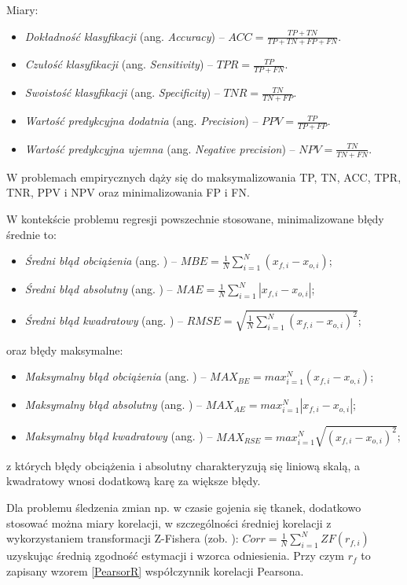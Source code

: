Miary:
\begin{itemize}[noitemsep,nolistsep]
	\item \textit{Dokładność klasyfikacji} (ang. \textit{Accuracy}) -- $ACC = \frac{TP + TN}{TP+TN+FP+FN}$.
	\item \textit{Czułość klasyfikacji} (ang. \textit{Sensitivity}) -- $TPR = \frac{TP}{TP + FN}$.
	\item \textit{Swoistość klasyfikacji} (ang. \textit{Specificity}) -- $TNR = \frac{TN}{TN + FP}$.
	\item \textit{Wartość predykcyjna dodatnia} (ang. \textit{Precision}) -- $PPV = \frac{TP}{TP + FP}$.
	\item \textit{Wartość predykcyjna ujemna} (ang. \textit{Negative precision}) -- $NPV = \frac{TN}{TN + FN}$.
\end{itemize}

W problemach empirycznych dąży się do maksymalizowania TP, TN, ACC, TPR, TNR, PPV i NPV oraz minimalizowania FP i FN. 

W kontekście problemu regresji powszechnie stosowane, minimalizowane błędy średnie to:

\begin{itemize}[noitemsep,nolistsep]
\item \textit{Średni błąd obciążenia} (ang. ) -- $MBE=\frac1N\sum_{i=1}^N{(x_{f,i}-x_{o,i})}$;
\item \textit{Średni błąd absolutny} (ang. ) --  $MAE=\frac1N\sum_{i=1}^N\left|x_{f,i}-x_{o,i}\right|$;
\item \textit{Średni błąd kwadratowy} (ang. ) -- $RMSE=\sqrt{\frac1N\sum_{i=1}^N\left(x_{f,i}-x_{o,i}\right)^2}$;
\end{itemize}
oraz błędy maksymalne:
\begin{itemize}[noitemsep,nolistsep]
	\item \textit{Maksymalny błąd obciążenia} (ang. ) -- $MAX_{BE}=max_{i=1}^N{(x_{f,i}-x_{o,i})}$;
	\item \textit{Maksymalny błąd absolutny} (ang. ) --  $MAX_{AE}=max_{i=1}^N\left|x_{f,i}-x_{o,i}\right|$;
	\item \textit{Maksymalny błąd kwadratowy} (ang. ) -- $MAX_{RSE}=max_{i=1}^N\sqrt{\left(x_{f,i}-x_{o,i}\right)^2}$;
\end{itemize}
z których błędy obciążenia i absolutny charakteryzują się liniową skalą, a kwadratowy wnosi dodatkową karę za większe błędy.   

Dla problemu śledzenia zmian np. w czasie gojenia się tkanek, dodatkowo stosować można miary korelacji, w szczególności średniej korelacji z wykorzystaniem transformacji Z-Fishera (zob. \cite{Corey1998}):
$Corr=\frac1N\sum_{i=1}^N{ZF(r_{f,i})}$  
uzyskując średnią zgodność estymacji i wzorca odniesienia. Przy czym $r_f$ to zapisany wzorem \ref{PearsorR} współczynnik korelacji Pearsona. 

